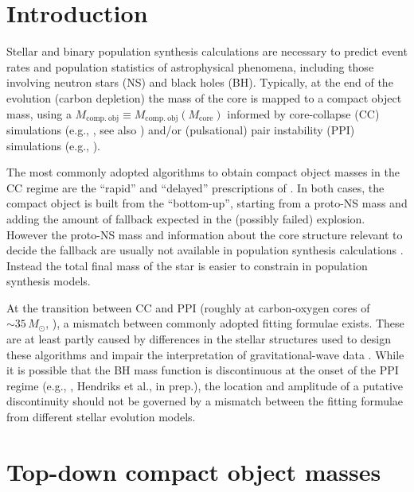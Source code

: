 \documentclass[twocolumn]{aastex63}
\begin{document}
\section{Introduction}

Stellar and binary population synthesis calculations are necessary to
predict event rates and population statistics of astrophysical
phenomena, including those involving neutron stars (NS) and
black holes (BH). Typically, at the end of the evolution (carbon
depletion) the mass of the core is mapped to a compact object mass, using a
$M_\mathrm{comp.\ obj}\equiv M_\mathrm{comp.\ obj}(M_\mathrm{core})$
informed by core-collapse (CC) simulations (e.g., \citealt{fryer:12,
  spera:15, mandel:20, couch:20}, see also \citealt{zapartas:21,
  patton:21}) and/or (pulsational) pair instability (PPI) simulations
(e.g., \citealt{belczynski:16, woosley:17, spera:17, stevenson:19,
  marchant:19, farmer:19, costa:21}).

The most commonly adopted algorithms to obtain compact object masses
in the CC regime are the ``rapid'' and ``delayed''
prescriptions of \cite{fryer:12}. In both cases, the compact object
is built from the ``bottom-up'', starting from a proto-NS mass and adding the amount of
fallback expected in the (possibly failed) explosion. However the
proto-NS mass and information about the core structure relevant
to decide the fallback are usually not available in population
synthesis calculations \citep[e.g.,][]{patton:20}. Instead the total final mass of
the star is easier to constrain in population synthesis models. %

At the transition between CC and PPI (roughly at carbon-oxygen cores
of $\sim{}35\,M_\odot$, \citealt{woosley:17, marchant:19, renzo:20csm,
  costa:21}), a mismatch between commonly adopted fitting formulae
exists. These are at least partly caused by differences in the stellar structures used to
design these algorithms and impair the
interpretation of gravitational-wave data \citep[as pointed out in
Fig.~5 of][]{vanson:21}. While it is possible that the BH mass
function is discontinuous at the onset of the PPI regime (e.g.,
\citealt{renzo:20conv,costa:21}, Hendriks et al., in prep.), the
location and amplitude of a putative discontinuity should not be
governed by a mismatch between the fitting formulae from different stellar
evolution models.

\section{Top-down compact object masses}
\end{document}
